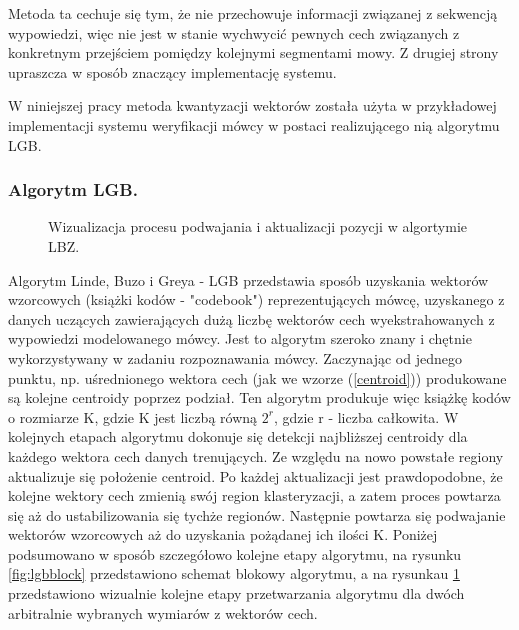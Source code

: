 Metoda ta cechuje się tym, że nie przechowuje informacji związanej z sekwencją wypowiedzi, więc nie jest w stanie wychwycić pewnych cech związanych z konkretnym przejściem pomiędzy kolejnymi segmentami mowy. Z drugiej strony upraszcza w sposób znaczący implementację systemu.


W niniejszej pracy metoda kwantyzacji wektorów została użyta w przykładowej implementacji systemu weryfikacji mówcy w postaci realizującego nią algorytmu LGB.

\subsubsection{Algorytm LGB.}
\label{lgb}

\begin{figure}
  \centering
    
    \caption{\label{fig:lgbvis} Wizualizacja procesu podwajania i aktualizacji pozycji w algortymie LBZ.}
\end{figure}

Algorytm Linde, Buzo i Greya - LGB \cite{linde} przedstawia sposób uzyskania wektorów wzorcowych (książki kodów - "codebook") reprezentujących mówcę, uzyskanego z danych uczących zawierających dużą liczbę wektorów cech wyekstrahowanych z wypowiedzi modelowanego mówcy. Jest to algorytm szeroko znany i chętnie wykorzystywany \cite{minidsp} w zadaniu rozpoznawania mówcy. Zaczynając od jednego punktu, np. uśrednionego wektora cech (jak we wzorze (\ref{centroid})) produkowane są kolejne centroidy
poprzez podział. Ten algorytm produkuje więc książkę kodów o rozmiarze K, gdzie K jest liczbą równą $2^r$, gdzie r - liczba całkowita. W kolejnych etapach algorytmu dokonuje się detekcji najbliższej centroidy dla każdego wektora cech danych trenujących. Ze względu na nowo powstałe regiony aktualizuje się położenie centroid. Po każdej aktualizacji jest prawdopodobne, że kolejne wektory cech zmienią swój region klasteryzacji, a zatem proces powtarza się aż do ustabilizowania się tychże regionów.
Następnie powtarza się podwajanie wektorów wzorcowych aż do uzyskania pożądanej ich ilości K. Poniżej podsumowano w sposób szczegółowo kolejne etapy algorytmu, na rysunku \ref{fig:lgbblock} przedstawiono schemat blokowy algorytmu, a na rysunkau \ref{fig:lgbvis} przedstawiono wizualnie kolejne etapy przetwarzania algorytmu dla dwóch arbitralnie wybranych wymiarów z wektorów cech.
\\


